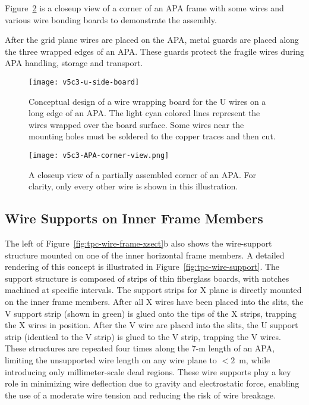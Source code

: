 Figure~\ref{fig:tpc-APA-corner} is a closeup view of a corner of an APA frame with some wires and various wire bonding boards to demonstrate the assembly.
   
After the grid plane wires are placed on the APA,  metal guards are placed along the three wrapped edges of an APA.  These guards protect the fragile wires during APA handling, storage and transport.


\begin{figure}[htpb]
\centering
\texttt{[image: v5c3-u-side-board]}
\caption[Concept of wire wrapping board for U wires on long edge of APA]{Conceptual design of a wire wrapping board for the U wires on a long edge of an APA.  The light cyan colored lines represent the wires wrapped over the board surface.  Some wires near the mounting holes must be soldered to the copper traces and then cut.}
\label{fig:tpc-wire-board-u-side}
\end{figure}

\begin{figure}[htbp]
\centering
\texttt{[image: v5c3-APA-corner-view.png]}
\caption[Closeup view of a partially assembled corner of an APA]{A closeup view of a partially assembled corner of an APA.  For clarity, only every other wire is shown in this illustration.  }
\label{fig:tpc-APA-corner}
\end{figure}

\subsection{Wire Supports on Inner Frame Members}

The left of Figure~\ref{fig:tpc-wire-frame-xsect}b also shows the wire-support 
structure mounted on one of the inner horizontal frame members. 
A detailed rendering of this concept is illustrated in 
Figure~\ref{fig:tpc-wire-support}. The support structure is composed of
strips of thin fiberglass boards, with notches machined at specific 
intervals. The support strips for X plane is directly mounted on the 
inner frame members.  After all X wires have been placed into the slits, 
the V support strip (shown in green) is glued onto the tips of the 
X strips, trapping the X wires in position.  After the V wire are placed 
into the slits, the U support strip (identical to the V strip) is glued 
to the V strip, trapping the V wires. These structures are 
repeated four times along the 7-m length of an APA, limiting the unsupported 
wire length on any wire plane to $< 2$~m, while introducing 
only millimeter-scale dead regions. These wire supports play a key role 
in minimizing wire deflection due to gravity and electrostatic force, 
enabling the use of a moderate wire tension and reducing the 
risk of wire breakage. 


